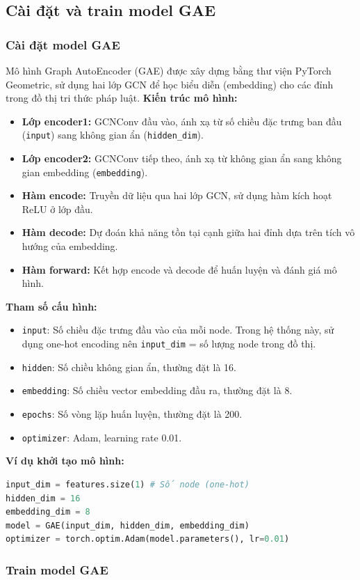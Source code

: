 \documentclass[a4paper]{article}
\begin{document}
\subsection{Cài đặt và train model GAE}
\subsubsection{Cài đặt model GAE}
Mô hình Graph AutoEncoder (GAE) được xây dựng bằng thư viện PyTorch Geometric, sử dụng hai lớp GCN để học biểu diễn (embedding) cho các đỉnh trong đồ thị tri thức pháp luật.
\textbf{Kiến trúc mô hình:}
\begin{itemize}
\item \textbf{Lớp encoder1:} GCNConv đầu vào, ánh xạ từ số chiều đặc trưng ban đầu (\texttt{input\dim}) sang không gian ẩn (\texttt{hidden\_dim}).
\item \textbf{Lớp encoder2:} GCNConv tiếp theo, ánh xạ từ không gian ẩn sang không gian embedding (\texttt{embedding\dim}).
\item \textbf{Hàm encode:} Truyền dữ liệu qua hai lớp GCN, sử dụng hàm kích hoạt ReLU ở lớp đầu.
\item \textbf{Hàm decode:} Dự đoán khả năng tồn tại cạnh giữa hai đỉnh dựa trên tích vô hướng của embedding.
\item \textbf{Hàm forward:} Kết hợp encode và decode để huấn luyện và đánh giá mô hình.
\end{itemize}
\textbf{Tham số cấu hình:}
\begin{itemize}
\item \texttt{input\dim}: Số chiều đặc trưng đầu vào của mỗi node. Trong hệ thống này, sử dụng one-hot encoding nên \texttt{input\_dim} = số lượng node trong đồ thị.
\item \texttt{hidden\dim}: Số chiều không gian ẩn, thường đặt là 16.
\item \texttt{embedding\dim}: Số chiều vector embedding đầu ra, thường đặt là 8.
\item \texttt{epochs}: Số vòng lặp huấn luyện, thường đặt là 200.
\item \texttt{optimizer}: Adam, learning rate 0.01.
\end{itemize}
\textbf{Ví dụ khởi tạo mô hình:}
\begin{lstlisting}[language=python]
input_dim = features.size(1) # Số node (one-hot)
hidden_dim = 16
embedding_dim = 8
model = GAE(input_dim, hidden_dim, embedding_dim)
optimizer = torch.optim.Adam(model.parameters(), lr=0.01)
\end{lstlisting}
\subsubsection{Train model GAE}
\end{document}
